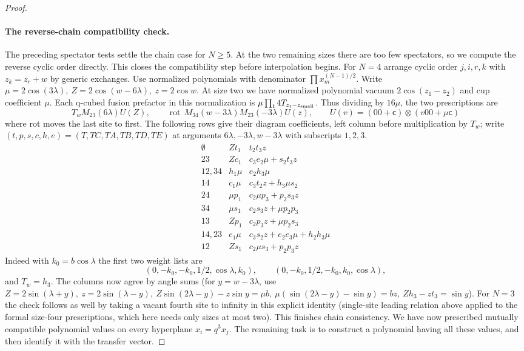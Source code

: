\begin{proof}
\paragraph{The reverse-chain compatibility check.}
The preceding spectator tests settle the chain case for \(N\ge5\).
At the two remaining sizes there are too few spectators, so we compute
the reverse cyclic order directly. This closes the compatibility step
before interpolation begins. For \(N=4\) arrange cyclic order \(j,i,r,k\) with \(z_k=z_r+w\) by generic exchanges. Use normalized polynomials with denominator \(\prod x_m^{(N-1)/2}\). Write \(\mu=2\cos(3\lambda),\ Z=2\cos(w-6\lambda),\ z=2\cos w\). At size two we have normalized polynomial vacuum \(2\cos(z_1-z_2)\) and cup coefficient \(\mu\). Each q-cubed fusion prefactor in this normalization is \(\mu\prod_t4T_{z_t-z_{\rm small}}\). Thus dividing by \(16\mu\), the two prescriptions are
\[
 T_w M_{23}(6\lambda)U(Z),\qquad
 \operatorname{rot}\,M_{34}(w-3\lambda)M_{23}(-3\lambda)U(z),\qquad
 U(v)=(00+\mathsf c)\otimes(v00+\mu \mathsf c)
\]
where rot moves the last site to first. The following rows give their diagram coefficients, left column before multiplication by \(T_w\); write \((t,p,s,c,h,e)=(T,TC,TA,TB,TD,TE)\) at arguments \(6\lambda,-3\lambda,w-3\lambda\) with subscripts \(1,2,3\).
\[
\begin{array}{c|cc}
 \emptyset& Zt_1&t_2t_3 z\\
23& Zc_1&c_3e_2\mu+s_2 t_3 z\\
12,34&h_1\mu&e_2h_3\mu\\
14&c_1\mu&c_3t_2 z+h_3\mu s_2\\
24&\mu p_1&c_2\mu p_3+p_2s_3 z\\
34&\mu s_1&c_2s_3 z+\mu p_2p_3\\
13&Z p_1& c_2p_3 z+\mu p_2s_3\\
14,23&e_1\mu&c_3s_2 z+e_2e_3\mu+h_2 h_3\mu\\
12&Zs_1&c_2\mu s_3+p_2p_3 z
\end{array}
\]
Indeed with \(k_0=b\cos\lambda\) the first two weight lists are
\[
 (0,-k_0,-k_0,1/2,\cos\lambda,k_0),\qquad
 (0,-k_0,1/2,-k_0,k_0,\cos\lambda),
\]
and \(T_w=h_3\). The columns now agree by angle sums (for \(y=w-3\lambda\), use \(Z=2\sin(\lambda+y),\ z=2\sin(\lambda-y),\ Z\sin(2\lambda-y)-z\sin y=\mu b,\ \mu(\sin(2\lambda-y)-\sin y)=bz,\ Z h_3-z t_3=\sin y\)). For \(N=3\) the check follows as well by taking a vacant fourth site to infinity in this explicit identity (single-site leading relation above applied to the formal size-four prescriptions, which here needs only sizes at most two). This finishes chain consistency. We have now prescribed mutually compatible
polynomial values on every hyperplane \(x_i=q^3x_j\). The remaining task is
to construct a polynomial having all these values, and then identify it
with the transfer vector.


\end{proof}
